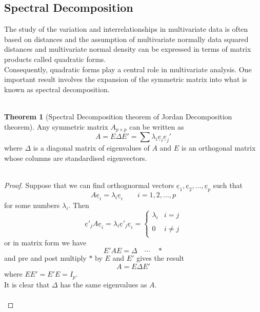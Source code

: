 \documentclass[11pt,a4paper]{article}
\theoremstyle{definition}
\newtheorem{thm}{Theorem}[section]
\begin{document}
\subsection{Spectral Decomposition}
The study of the variation and interrelationships in multivariate data is often based on distances and the assumption of multivariate normally data squared distances and multivariate normal density can be expressed in terms of matrix products called quadratic forms. \\
Consequently, quadratic forms play a central role in multivariate analysis. One important result involves the expansion of the symmetric matrix into what is known as spectral decomposition.\\\\



\begin{thm}[Spectral Decomposition theorem of Jordan Decomposition theorem]
Any symmetric matrix $A_{p\times p}$ can be written as $$A = E\Delta E' = \sum \lambda_i\underline{e}_i\underline{e}_j'$$ where $\Delta$ is a diagonal matrix of eigenvalues of $A$ and $E$ is an orthogonal matrix whose columns are standardised eigenvectors.\\\\
\end{thm}


\begin{proof}
Suppose that we can find orthognormal vectors $\underline{e}_1,\underline{e}_2,\ldots,\underline{e}_p$ such that $$A \underline{e}_i = \lambda_i \underline{e}_i\qquad i = 1,2,\ldots, p$$
for some numbers $\lambda_i$. Then $$\underline{e}'_jA\underline{e}_i = \lambda_i \underline{e}'_j \underline{e}_i = \begin{cases}
\lambda_i & i = j\\\\
0 & i\neq j\\
\end{cases}$$ or in matrix form we have $$E'AE = \Delta\quad \cdots\quad  *$$ and pre and post multiply $*$ by $E$ and $E'$ gives the result $$A = E\Delta E'$$ where $EE' =  E'E = I_p$.\\
It is clear that $\Delta$ has the same eigenvalues as $A$.\\\\
\end{proof}
\end{document}
